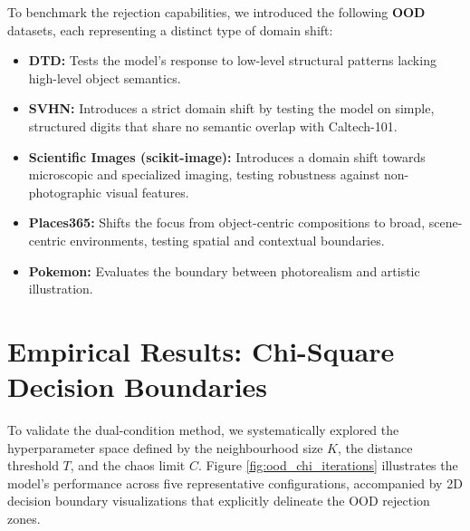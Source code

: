 \documentclass[oneside]{ctuthesis}
\begin{document}
To benchmark the rejection capabilities, we introduced the following \textbf{OOD} datasets, each representing a distinct type of domain shift:
\begin{itemize}
    \item \textbf{DTD:} Tests the model's response to low-level structural patterns lacking high-level object semantics.
    \item \textbf{SVHN:} Introduces a strict domain shift by testing the model on simple, structured digits that share no semantic overlap with Caltech-101.
    \item \textbf{Scientific Images (scikit-image):} Introduces a domain shift towards microscopic and specialized imaging, testing robustness against non-photographic visual features.
    \item \textbf{Places365:} Shifts the focus from object-centric compositions to broad, scene-centric environments, testing spatial and contextual boundaries.
    \item \textbf{Pokemon:} Evaluates the boundary between photorealism and artistic illustration.
\end{itemize}

\section{Empirical Results: Chi-Square Decision Boundaries}
\label{sec:ood_chi_results}

To validate the dual-condition method, we systematically explored the hyperparameter space defined by the neighbourhood size $K$, the distance threshold $T$, and the chaos limit $C$. Figure \ref{fig:ood_chi_iterations} illustrates the model's performance across five representative configurations, accompanied by 2D decision boundary visualizations that explicitly delineate the OOD rejection zones.
\end{document}

